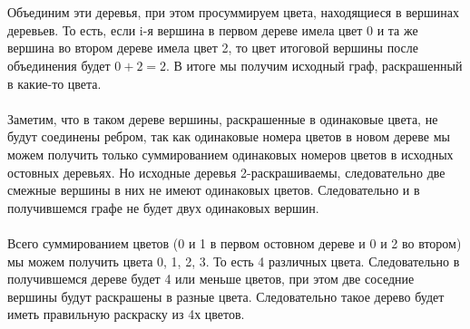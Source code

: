 \documentclass[a4paper, 12pt]{article}
\begin{document}
    \\
    \\ Объединим эти деревья, при этом просуммируем цвета, находящиеся в вершинах деревьев. То есть, если i-я вершина в первом дереве имела цвет 0 и та же вершина во втором дереве имела цвет 2, то цвет итоговой вершины после объединения будет $0 + 2 = 2$. В итоге мы получим исходный граф, раскрашенный в какие-то цвета.
    \\
    \\ Заметим, что в таком дереве вершины, раскрашенные в одинаковые цвета, не будут соединены ребром, так как одинаковые номера цветов в новом дереве мы можем получить только суммированием одинаковых номеров цветов в исходных остовных деревьях. Но исходные деревья 2-раскрашиваемы, следовательно две смежные вершины в них не имеют одинаковых цветов. Следовательно и в получившемся графе не будет двух одинаковых вершин.
    \\
    \\ Всего суммированием цветов (0 и 1 в первом остовном дереве и 0 и 2 во втором) мы можем получить цвета 0, 1, 2, 3. То есть 4 различных цвета. Следовательно в получившемся дереве будет 4 или меньше цветов, при этом две соседние вершины будут раскрашены в разные цвета. Следовательно такое дерево будет иметь правильную раскраску из 4х цветов.
\end{document}
